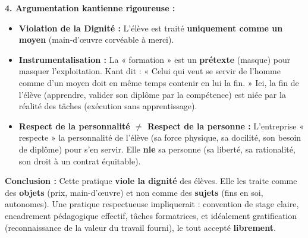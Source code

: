 \documentclass[11pt]{article}
\begin{document}
\begin{exoresolu}
\textbf{4. Argumentation kantienne rigoureuse :}
\begin{itemize}
    \item \textbf{Violation de la Dignité :} L'élève est traité \textbf{uniquement comme un moyen} (main-d'œuvre corvéable à merci).
    \item \textbf{Instrumentalisation :} La « formation » est un \textbf{prétexte} (masque) pour masquer l'exploitation. Kant dit : « Celui qui veut se servir de l'homme comme d'un moyen doit en même temps contenir en lui la fin. » Ici, la fin de l'élève (apprendre, valider son diplôme par la compétence) est niée par la réalité des tâches (exécution sans apprentissage).
    \item \textbf{Respect de la personnalité $\neq$ Respect de la personne :} L'entreprise « respecte » la personnalité de l'élève (sa force physique, sa docilité, son besoin de diplôme) pour s'en servir. Elle \textbf{nie} sa personne (sa liberté, sa rationalité, son droit à un contrat équitable).
\end{itemize}

\textbf{Conclusion :} Cette pratique \textbf{viole la dignité} des élèves. Elle les traite comme des \textbf{objets} (prix, main-d'œuvre) et non comme des \textbf{sujets} (fins en soi, autonomes). Une pratique respectueuse impliquerait : convention de stage claire, encadrement pédagogique effectif, tâches formatrices, et idéalement gratification (reconnaissance de la valeur du travail fourni), le tout accepté \textbf{librement}.
\end{exoresolu}
\end{document}
